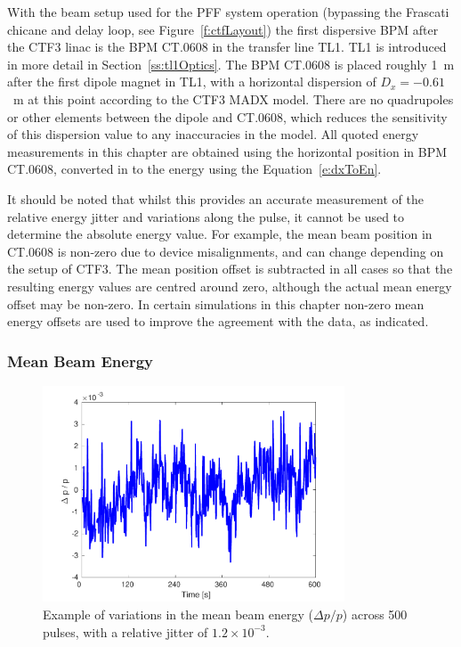 With the beam setup used for the PFF system operation (bypassing the Frascati chicane and delay loop, see Figure~\ref{f:ctfLayout}) the first dispersive BPM after the CTF3 linac is the BPM CT.0608 in the transfer line TL1.  TL1 is introduced in more detail in Section~\ref{ss:tl1Optics}. The BPM CT.0608 is placed roughly 1~m after the first dipole magnet in TL1, with a horizontal dispersion of \(D_{x} = -0.61\)~m at this point according to the CTF3 MADX model. There are no quadrupoles or other elements between the dipole and CT.0608, which reduces the sensitivity of this dispersion value to any inaccuracies in the model. All quoted energy measurements in this chapter are obtained using the horizontal position in BPM CT.0608, converted in to the energy using the Equation~\ref{e:dxToEn}. %

It should be noted that whilst this provides an accurate measurement of the relative energy jitter and variations along the pulse, it cannot be used to determine the absolute energy value. For example, the mean beam position in CT.0608 is non-zero due to device misalignments, and can change depending on the setup of CTF3. The mean position offset is subtracted in all cases so that the resulting energy values are centred around zero, although the actual mean energy offset may be non-zero. In certain simulations in this chapter non-zero mean energy offsets are used to improve the agreement with the data, as indicated.

\subsubsection{Mean Beam Energy}

\begin{figure}
  \centering
  \includegraphics[width=0.8\textwidth]{Figures/propagation/enJitter_mean}
  \caption{Example of variations in the mean beam energy (\(\Delta p/p\)) across 500 pulses, with a relative jitter of \(1.2\times 10^{-3}\).}
  \label{f:enJitter_mean}
\end{figure}

